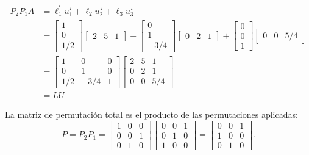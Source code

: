 \begin{equation*}\begin{split} P_2P_1 A & = \ell_1^{\prime}u_1^\star + \ell_2 u_2^\star + \ell_3 u_3^\star \\ & = \begin{bmatrix} 1 \\ 0 \\ 1/2 \end{bmatrix} \begin{bmatrix} 2 & 5 & 1 \end{bmatrix} + \begin{bmatrix} 0 \\ 1 \\ -3/4 \end{bmatrix}
\begin{bmatrix} 0 & 2 & 1 \end{bmatrix} + \begin{bmatrix}
    0 \\ 0 \\ 1
\end{bmatrix}\begin{bmatrix}
    0 & 0 & 5/4
\end{bmatrix}
\\ & = \begin{bmatrix}
1 & 0 & 0 \\
0 & 1 & 0 \\
1/2 & -3/4 & 1
\end{bmatrix}
\begin{bmatrix}
2 & 5 & 1 \\
0 & 2 & 1 \\
0 & 0 & 5/4
\end{bmatrix} 
\\ & = LU
 \end{split}
 \end{equation*}


La matriz de permutación total es el producto de las permutaciones aplicadas:
\[
P = P_2 P_1 =
\begin{bmatrix}
1 & 0 & 0 \\
0 & 0 & 1 \\
0 & 1 & 0
\end{bmatrix}
\begin{bmatrix}
0 & 0 & 1 \\
0 & 1 & 0 \\
1 & 0 & 0
\end{bmatrix}
=
\begin{bmatrix}
0 & 0 & 1 \\
1 & 0 & 0 \\
0 & 1 & 0
\end{bmatrix}.
\]

